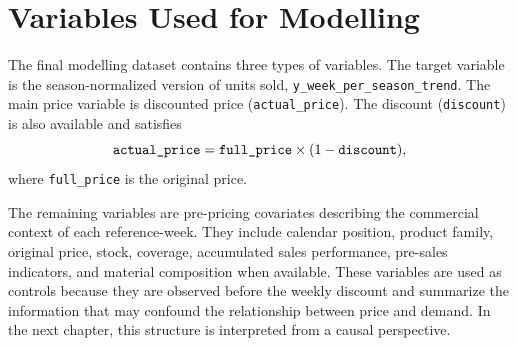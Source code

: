 \section{Variables Used for Modelling}
\label{sec:variables-modelling}

The final modelling dataset contains three types of variables. The target variable is the season-normalized version of units sold, \mbox{\texttt{y\_week\_per\_season\_trend}}. The main price variable is discounted price (\mbox{\texttt{actual\_price}}). The discount (\mbox{\texttt{discount}}) is also available and satisfies
\[
\mbox{\texttt{actual\_price}} = \mbox{\texttt{full\_price}} \times (1 - \mbox{\texttt{discount}}),
\]
where \mbox{\texttt{full\_price}} is the original price.

The remaining variables are pre-pricing covariates describing the commercial context of each reference-week. They include calendar position, product family, original price, stock, coverage, accumulated sales performance, pre-sales indicators, and material composition when available. These variables are used as controls because they are observed before the weekly discount and summarize the information that may confound the relationship between price and demand. In the next chapter, this structure is interpreted from a causal perspective.
